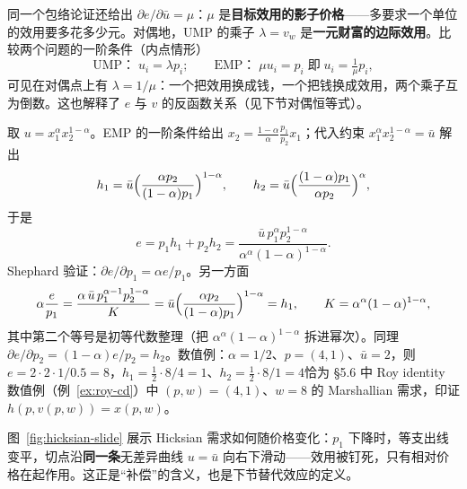 \begin{remark}
同一个包络论证还给出 $\partial e/\partial\bar u=\mu$：$\mu$ 是\textbf{目标效用的影子价格}——多要求一个单位的效用要多花多少元。对偶地，UMP 的乘子 $\lambda=v_w$ 是\textbf{一元财富的边际效用}。比较两个问题的一阶条件（内点情形）
\[
 \text{UMP：}\;u_i=\lambda p_i;\qquad
 \text{EMP：}\;\mu u_i=p_i\;\text{即}\;u_i=\tfrac{1}{\mu}p_i,
\]
可见在对偶点上有 $\lambda=1/\mu$：一个把效用换成钱，一个把钱换成效用，两个乘子互为倒数。这也解释了 $e$ 与 $v$ 的反函数关系（见下节对偶恒等式）。
\end{remark}

\begin{example}
取 $u=x_1^{\alpha}x_2^{1-\alpha}$。EMP 的一阶条件给出 $x_2=\frac{1-\alpha}{\alpha}\frac{p_1}{p_2}x_1$；代入约束 $x_1^{\alpha}x_2^{1-\alpha}=\bar u$ 解出
\[
 h_1=\bar u\Bigl(\frac{\alpha p_2}{(1-\alpha)p_1}\Bigr)^{1-\alpha},\qquad
 h_2=\bar u\Bigl(\frac{(1-\alpha)p_1}{\alpha p_2}\Bigr)^{\alpha},
\]
于是
\[
 e=p_1h_1+p_2h_2=\frac{\bar u\,p_1^{\alpha}p_2^{1-\alpha}}{\alpha^{\alpha}(1-\alpha)^{1-\alpha}} .
\]
Shephard 验证：$\partial e/\partial p_1=\alpha e/p_1$。另一方面
\[
 \alpha\frac{e}{p_1}
 =\frac{\alpha\,\bar u\,p_1^{\alpha-1}p_2^{1-\alpha}}{K}
 =\bar u\Bigl(\frac{\alpha p_2}{(1-\alpha)p_1}\Bigr)^{1-\alpha}=h_1,\qquad K=\alpha^{\alpha}(1-\alpha)^{1-\alpha},
\]
其中第二个等号是初等代数整理（把 $\alpha^{\alpha}(1-\alpha)^{1-\alpha}$ 拆进幂次）。同理 $\partial e/\partial p_2=(1-\alpha)e/p_2=h_2$。数值例：$\alpha=1/2$、$p=(4,1)$、$\bar u=2$，则 $e=2\cdot 2\cdot 1/0.5=8$，$h_1=\tfrac12\cdot 8/4=1$、$h_2=\tfrac12\cdot 8/1=4$恰为 \S 5.6 中 Roy identity 数值例（例~\ref{ex:roy-cd}）中 $(p,w)=(4,1)$、$w=8$ 的 Marshallian 需求，印证 $h(p,v(p,w))=x(p,w)$。
\end{example}

图~\ref{fig:hicksian-slide} 展示 Hicksian 需求如何随价格变化：$p_1$ 下降时，等支出线变平，切点沿\textbf{同一条}无差异曲线 $u=\bar u$ 向右下滑动——效用被钉死，只有相对价格在起作用。这正是“补偿”的含义，也是下节替代效应的定义。

